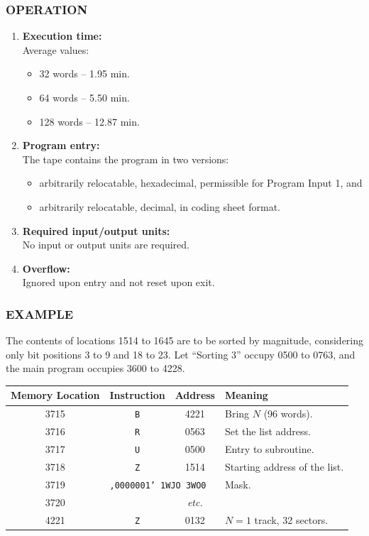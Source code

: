 \subsubsection*{OPERATION}
\begin{enumerate}
    \item \textbf{Execution time:} \\
    Average values:
    \begin{itemize}
        \item 32 words -- 1.95 min.
        \item 64 words -- 5.50 min.
        \item 128 words -- 12.87 min.
    \end{itemize}
    \item \textbf{Program entry:} \\
    The tape contains the program in two versions:
    \begin{itemize}
        \item[a)] arbitrarily relocatable, hexadecimal, permissible for Program Input 1, and
        \item[b)] arbitrarily relocatable, decimal, in coding sheet format.
    \end{itemize}
    \item \textbf{Required input/output units:} \\
    No input or output units are required.
    \item \textbf{Overflow:} \\
    Ignored upon entry and not reset upon exit.
\end{enumerate}

\subsubsection*{EXAMPLE}
The contents of locations 1514 to 1645 are to be sorted by magnitude, considering only bit positions 3 to 9 and 18 to 23. Let ``Sorting 3'' occupy 0500 to 0763, and the main program occupies 3600 to 4228.

\begin{table}[h!]
\centering
\begin{tabularx}{\textwidth}{cccX}
\toprule
\textbf{Memory Location} & \textbf{Instruction} & \textbf{Address} & \textbf{Meaning} \\
\midrule
3715 & \texttt{B} & 4221 & Bring $N$ (96 words). \\
3716 & \texttt{R} & 0563 & Set the list address. \\
3717 & \texttt{U} & 0500 & Entry to subroutine. \\
3718 & \texttt{Z} & 1514 & Starting address of the list. \\
3719 & \multicolumn{2}{l}{\texttt{,0000001' 1WJO 3WO0}} & Mask. \\
3720 &            & \textit{etc.} & \\
\midrule
4221 & \texttt{Z} & 0132 & $N = 1$ track, 32 sectors. \\
\bottomrule
\end{tabularx}
\end{table}

